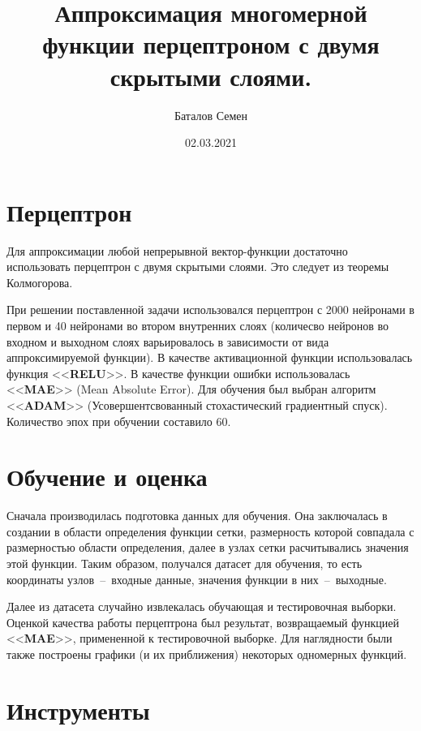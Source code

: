 \documentclass[12pt, a4paper]{article}
\title{Аппроксимация многомерной функции перцептроном с двумя скрытыми слоями.}
\author{Баталов Семен}
\date{02.03.2021}
\begin{document}
    
    \sloppy
    
    \maketitle
    
    \section{Перцептрон}
    
    Для аппроксимации любой непрерывной вектор-функции достаточно 
    использовать перцептрон с двумя скрытыми слоями. Это следует из теоремы 
    Колмогорова.
    
    При решении поставленной задачи использовался перцептрон с 2000 
    нейронами в первом и 40 нейронами во втором внутренних слоях (количесво 
    нейронов во входном и выходном слоях варьировалось в зависимости от вида 
    аппроксимируемой функции). В качестве активационной функции 
    использовалась функция <<\textbf{RELU}>>. В качестве функции ошибки 
    использовалась <<\textbf{MAE}>> (Mean Absolute Error). Для обучения был 
    выбран алгоритм <<\textbf{ADAM}>> (Усовершентсвованный стохастический 
    градиентный спуск). Количество эпох при обучении составило 60.
    
    \section{Обучение и оценка}
    
    Сначала производилась подготовка данных для обучения. Она заключалась в 
    создании в области определения функции сетки, размерность которой 
    совпадала с размерностью области определения, далее в узлах сетки 
    расчитывались значения этой функции. Таким образом, получался датасет 
    для обучения, то есть координаты узлов~--~входные данные, значения 
    функции в них~--~выходные.
    
    Далее из датасета случайно извлекалась обучающая и тестировочная 
    выборки. Оценкой качества работы перцептрона был результат, возвращаемый 
    функцией <<\textbf{MAE}>>, примененной к тестировочной выборке. Для 
    наглядности были также построены графики (и их приближения) некоторых 
    одномерных функций.
    
    \section{Инструменты}
    
\end{document}
